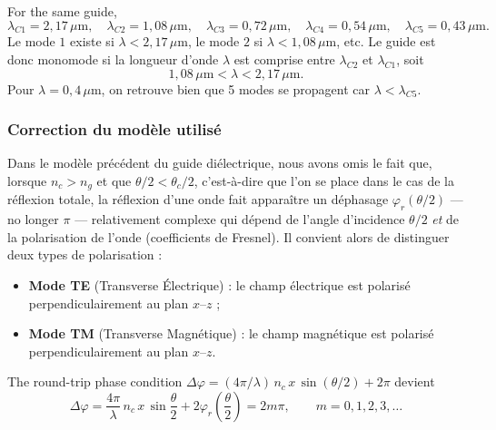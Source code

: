 \begin{example}
  For the same guide,
  \[
    \lambda_{C1} = 2{,}17\,\mu\mathrm{m},\quad
    \lambda_{C2} = 1{,}08\,\mu\mathrm{m},\quad
    \lambda_{C3} = 0{,}72\,\mu\mathrm{m},\quad
    \lambda_{C4} = 0{,}54\,\mu\mathrm{m},\quad
    \lambda_{C5} = 0{,}43\,\mu\mathrm{m}.
  \]
  Le mode $1$ existe si $\lambda < 2{,}17\,\mu$m, le mode $2$ si
  $\lambda < 1{,}08\,\mu$m, etc. Le guide est donc monomode si la longueur
  d'onde $\lambda$ est comprise entre $\lambda_{C2}$ et $\lambda_{C1}$, soit
  \[
    1{,}08\,\mu\mathrm{m} < \lambda < 2{,}17\,\mu\mathrm{m}.
  \]
  Pour $\lambda = 0{,}4\,\mu$m, on retrouve bien que 5 modes se propagent car
  $\lambda < \lambda_{C5}$.
\end{example}

\subsubsection{Correction du modèle utilisé}
Dans le modèle précédent du guide diélectrique, nous avons omis le fait que,
lorsque $n_c > n_g$ et que $\theta/2 < \theta_c/2$, c'est-à-dire que l'on se
place dans le cas de la réflexion totale, la réflexion d'une onde fait
apparaître un déphasage $\varphi_r(\theta/2)$ --- no longer $\pi$ ---
relativement complexe qui dépend de l'angle d'incidence $\theta/2$ \emph{et}
de la polarisation de l'onde (coefficients de Fresnel). Il convient alors de
distinguer deux types de polarisation :
\begin{itemize}
  \item \textbf{Mode TE} (Transverse Électrique) : le champ
    électrique est polarisé perpendiculairement au plan $x$--$z$ ;
  \item \textbf{Mode TM} (Transverse Magnétique) : le champ
    magnétique est polarisé perpendiculairement au plan $x$--$z$.
\end{itemize}
The round-trip phase condition
$\Delta\varphi = (4\pi/\lambda)\,n_c\,x\,\sin(\theta/2) + 2\pi$ devient
\begin{equation*}
  \Delta\varphi = \frac{4\pi}{\lambda}\,n_c\,x\,\sin\frac{\theta}{2}
    + 2\varphi_r\!\left(\frac{\theta}{2}\right) = 2m\pi,
  \qquad m = 0,1,2,3,\dots
\end{equation*}

